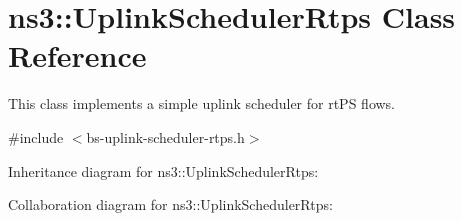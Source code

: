 \hypertarget{classns3_1_1UplinkSchedulerRtps}{}\section{ns3\+:\+:Uplink\+Scheduler\+Rtps Class Reference}
\label{classns3_1_1UplinkSchedulerRtps}


This class implements a simple uplink scheduler for rt\+PS flows.  




{\ttfamily \#include $<$bs-\/uplink-\/scheduler-\/rtps.\+h$>$}



Inheritance diagram for ns3\+:\+:Uplink\+Scheduler\+Rtps\+:


Collaboration diagram for ns3\+:\+:Uplink\+Scheduler\+Rtps\+:
